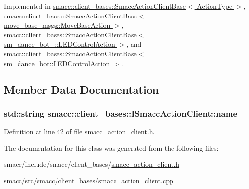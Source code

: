 Implemented in \hyperlink{classsmacc_1_1client__bases_1_1SmaccActionClientBase_a97192acd7bb7cac5de0191e700ab72ee}{smacc\+::client\+\_\+bases\+::\+Smacc\+Action\+Client\+Base$<$ Action\+Type $>$}, \hyperlink{classsmacc_1_1client__bases_1_1SmaccActionClientBase_a97192acd7bb7cac5de0191e700ab72ee}{smacc\+::client\+\_\+bases\+::\+Smacc\+Action\+Client\+Base$<$ move\+\_\+base\+\_\+msgs\+::\+Move\+Base\+Action $>$}, \hyperlink{classsmacc_1_1client__bases_1_1SmaccActionClientBase_a97192acd7bb7cac5de0191e700ab72ee}{smacc\+::client\+\_\+bases\+::\+Smacc\+Action\+Client\+Base$<$ sm\+\_\+dance\+\_\+bot\+\_\+::\+L\+E\+D\+Control\+Action $>$}, and \hyperlink{classsmacc_1_1client__bases_1_1SmaccActionClientBase_a97192acd7bb7cac5de0191e700ab72ee}{smacc\+::client\+\_\+bases\+::\+Smacc\+Action\+Client\+Base$<$ sm\+\_\+dance\+\_\+bot\+::\+L\+E\+D\+Control\+Action $>$}.



\subsection{Member Data Documentation}
\subsubsection[{\texorpdfstring{name\+\_\+}{name_}}]{\setlength{\rightskip}{0pt plus 5cm}std\+::string smacc\+::client\+\_\+bases\+::\+I\+Smacc\+Action\+Client\+::name\+\_\+\hspace{0.3cm}{\ttfamily [protected]}}\hypertarget{classsmacc_1_1client__bases_1_1ISmaccActionClient_a74c660a4c111a3b8858b9b7b1cedc866}{}\label{classsmacc_1_1client__bases_1_1ISmaccActionClient_a74c660a4c111a3b8858b9b7b1cedc866}


Definition at line 42 of file smacc\+\_\+action\+\_\+client.\+h.



The documentation for this class was generated from the following files\+:\begin{DoxyCompactItemize}
\item 
smacc/include/smacc/client\+\_\+bases/\hyperlink{smacc__action__client_8h}{smacc\+\_\+action\+\_\+client.\+h}\item 
smacc/src/smacc/client\+\_\+bases/\hyperlink{smacc__action__client_8cpp}{smacc\+\_\+action\+\_\+client.\+cpp}\end{DoxyCompactItemize}

